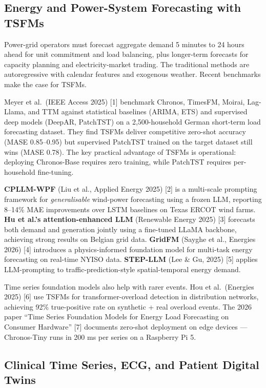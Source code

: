 \subsection{Energy and Power-System Forecasting with TSFMs}\label{energy-and-power-system-forecasting-with-tsfms}

Power-grid operators must forecast aggregate demand 5 minutes to 24 hours ahead for unit commitment and load balancing, plus longer-term forecasts for capacity planning and electricity-market trading. The traditional methods are autoregressive with calendar features and exogenous weather. Recent benchmarks make the case for TSFMs.

Meyer et al.~(IEEE Access 2025) {[}1{]} benchmark Chronos, TimesFM, Moirai, Lag-Llama, and TTM against statistical baselines (ARIMA, ETS) and supervised deep models (DeepAR, PatchTST) on a 2,500-household German short-term load forecasting dataset. They find TSFMs deliver competitive zero-shot accuracy (MASE 0.85--0.95) but supervised PatchTST trained on the target dataset still wins (MASE 0.78). The key practical advantage of TSFMs is operational: deploying Chronos-Base requires zero training, while PatchTST requires per-household fine-tuning.

\textbf{CPLLM-WPF} (Liu et al., Applied Energy 2025) {[}2{]} is a multi-scale prompting framework for \emph{generalisable} wind-power forecasting using a frozen LLM, reporting 8--14\% MAE improvements over LSTM baselines on Texas ERCOT wind farms. \textbf{Hu et al.'s attention-enhanced LLM} (Renewable Energy 2025) {[}3{]} forecasts both demand and generation jointly using a fine-tuned LLaMA backbone, achieving strong results on Belgian grid data. \textbf{GridFM} (Sayghe et al., Energies 2026) {[}4{]} introduces a physics-informed foundation model for multi-task energy forecasting on real-time NYISO data. \textbf{STEP-LLM} (Lee \& Gu, 2025) {[}5{]} applies LLM-prompting to traffic-prediction-style spatial-temporal energy demand.

Time series foundation models also help with rarer events. Hou et al.~(Energies 2025) {[}6{]} use TSFMs for transformer-overload detection in distribution networks, achieving 92\% true-positive rate on synthetic + real overload events. The 2026 paper ``Time Series Foundation Models for Energy Load Forecasting on Consumer Hardware'' {[}7{]} documents zero-shot deployment on edge devices --- Chronos-Tiny runs in 200 ms per series on a Raspberry Pi 5.

\subsection{Clinical Time Series, ECG, and Patient Digital Twins}\label{clinical-time-series-ecg-and-patient-digital-twins}

